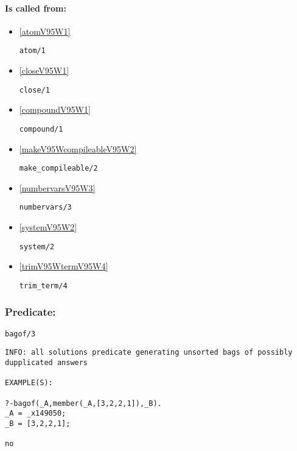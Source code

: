 \paragraph{Is called from:} 
\begin{itemize}
\item \ref{atomV95W1} 
\begin{verbatim}
atom/1
\end{verbatim}

\item \ref{closeV95W1} 
\begin{verbatim}
close/1
\end{verbatim}

\item \ref{compoundV95W1} 
\begin{verbatim}
compound/1
\end{verbatim}

\item \ref{makeV95WcompileableV95W2} 
\begin{verbatim}
make_compileable/2
\end{verbatim}

\item \ref{numbervarsV95W3} 
\begin{verbatim}
numbervars/3
\end{verbatim}

\item \ref{systemV95W2} 
\begin{verbatim}
system/2
\end{verbatim}

\item \ref{trimV95WtermV95W4} 
\begin{verbatim}
trim_term/4
\end{verbatim}

\end{itemize}

\subsubsection{Predicate:} \label{bagofV95W3}

\begin{verbatim}
bagof/3
\end{verbatim}

{\small \begin{verbatim}
INFO: all solutions predicate generating unsorted bags of possibly dupplicated answers

EXAMPLE(S):

?-bagof(_A,member(_A,[3,2,2,1]),_B).
_A = _x149050;
_B = [3,2,2,1];

no

\end{verbatim}}
